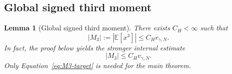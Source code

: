 \documentclass[11pt]{article}
\newtheorem{lemma}[lemma]{Lemma}
\theoremstyle{definition}
\newcommand{\E}{\mathbb{E}}
\newcommand{\remscale}{r_{\gamma,N}}
\newcommand{\fourthscale}{v_{\gamma,N}}
\begin{document}
\subsection{Global signed third moment}

\begin{lemma}[Global signed third moment]
\label{lem:M3}
There exists $C_H<\infty$ such that
\begin{equation}
\label{eq:M3-target}
  |M_3|:=|\E[x^3]|\le C_H\remscale.
\end{equation}
In fact, the proof below yields the stronger internal estimate
\begin{equation}
\label{eq:M3-strong}
  |M_3|\le C_H\fourthscale.
\end{equation}
Only Equation~\eqref{eq:M3-target} is needed for the main theorem.
\end{lemma}
\end{document}
